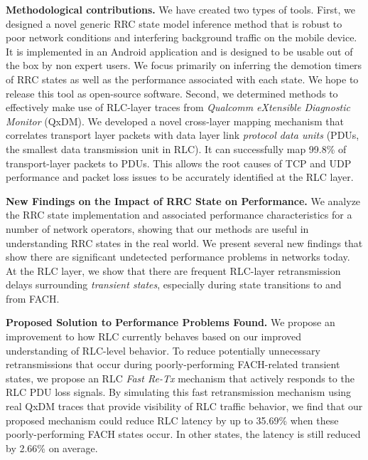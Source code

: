 \noindent{}\indent \textbf{Methodological contributions.} We have created two types of tools. First, we designed a novel generic RRC state model inference method that is robust to poor network conditions and interfering background traffic on the mobile device. It is implemented in an Android application and is designed to be usable out of the box by non expert users.  We focus primarily on inferring the demotion timers of RRC states as well as the performance associated with each state. We hope to release this tool as open-source software. Second, we determined methods to effectively make use of RLC-layer traces from \textit{Qualcomm eXtensible Diagnostic Monitor} (QxDM). We developed a novel cross-layer mapping mechanism that correlates transport layer packets with data layer link \textit{protocol data units} (PDUs, the smallest data transmission unit in RLC). It can successfully map 99.8\% of transport-layer packets to PDUs. This allows the root causes of TCP and UDP performance and packet loss issues to be accurately identified at the RLC layer.

\noindent{}\indent  \textbf{New Findings on the Impact of RRC State on Performance.} We analyze the RRC state implementation and associated performance characteristics for a number of network operators, showing that our methods are useful in understanding RRC states in the real world. We present several new findings that show there are significant undetected performance problems in networks today. At the RLC layer, we show that there are frequent RLC-layer retransmission delays surrounding \textit{transient states}, especially during state transitions to and from FACH. 

\noindent{}\indent \textbf{Proposed Solution to Performance Problems Found.} We propose an improvement to how RLC currently behaves based on our improved understanding of RLC-level behavior. To reduce potentially unnecessary retransmissions that occur during poorly-performing FACH-related transient states, we propose an RLC \emph{Fast Re-Tx} mechanism that actively responds to the RLC PDU loss signals. By simulating this fast retransmission mechanism using real QxDM traces that provide visibility of RLC traffic behavior, we find that our proposed mechanism could reduce RLC latency by up to 35.69\% when these poorly-performing FACH states occur. In other states, the latency is still reduced by 2.66\% on average.


